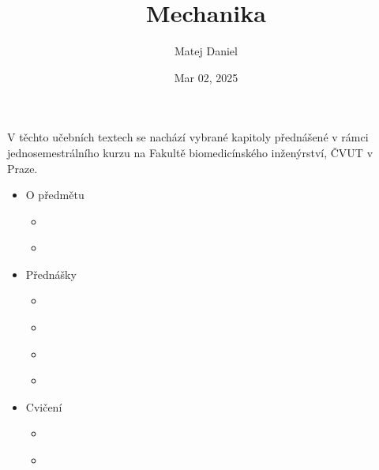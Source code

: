 \documentclass[letterpaper,10pt,english]{jupyterBook}
\title{Mechanika}
\date{Mar 02, 2025}
\author{Matej Daniel}
\begin{document}
\pagestyle{empty}
\sphinxmaketitle
\pagestyle{plain}
\sphinxtableofcontents
\pagestyle{normal}
\label{\detokenize{intro::doc}}


\sphinxAtStartPar
V těchto učebních textech se nachází vybrané kapitoly přednášené v rámci jednosemestrálního kurzu na Fakultě biomedicínského inženýrství, ČVUT v Praze.
\begin{itemize}
\item {} 
\sphinxAtStartPar
O předmětu

\begin{itemize}
\item {} 
\sphinxAtStartPar
{\hyperref[\detokenize{Misc/Podm_xednky_z_xe1po_u010dtu_a_zkou_u0161ky::doc}]{}}

\item {} 
\sphinxAtStartPar
{\hyperref[\detokenize{Misc/Sylabus_LS2025::doc}]{}}

\end{itemize}
\end{itemize}
\begin{itemize}
\item {} 
\sphinxAtStartPar
Přednášky

\begin{itemize}
\item {} 
\sphinxAtStartPar
{\hyperref[\detokenize{Prednasky/0_1_Definice_a_historie_mechaniky::doc}]{}}

\item {} 
\sphinxAtStartPar
{\hyperref[\detokenize{Prednasky/0_2_Skal_xe1ry_a_vektory::doc}]{}}

\item {} 
\sphinxAtStartPar
{\hyperref[\detokenize{Prednasky/1_2_Kinematika_v_1D::doc}]{}}

\item {} 
\sphinxAtStartPar
{\hyperref[\detokenize{Prednasky/2_1_Mechanick_xe9_vlastnosti_materi_xe1lu::doc}]{}}

\end{itemize}
\end{itemize}
\begin{itemize}
\item {} 
\sphinxAtStartPar
Cvičení

\begin{itemize}
\item {} 
\sphinxAtStartPar
{\hyperref[\detokenize{Cviceni/C1::doc}]{}}

\item {} 
\sphinxAtStartPar
{\hyperref[\detokenize{Cviceni/C2::doc}]{}}

\end{itemize}
\end{itemize}
\end{document}
